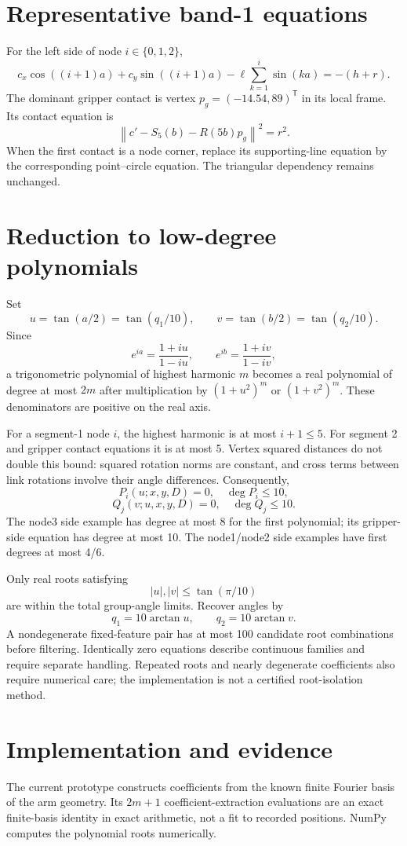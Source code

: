 \documentclass{article}
\begin{document}
\section{Representative band-1 equations}
For the left side of node $i\in\{0,1,2\}$,
\[
\boxed{c_x\cos((i+1)a)+c_y\sin((i+1)a)
-\ell\sum_{k=1}^{i}\sin(ka)=-(h+r).}
\]
The dominant gripper contact is vertex $p_g=(-14.54,89)^\mathsf T$ in its local frame. Its contact equation is
\[
\boxed{\left\|c'-S_5(b)-R(5b)p_g\right\|^2=r^2.}
\]
When the first contact is a node corner, replace its supporting-line equation by the corresponding point--circle equation. The triangular dependency remains unchanged.

\section{Reduction to low-degree polynomials}
Set
\[
u=\tan(a/2)=\tan(q_1/10),\qquad
v=\tan(b/2)=\tan(q_2/10).
\]
Since
\[
e^{ia}=\frac{1+iu}{1-iu},\qquad
e^{ib}=\frac{1+iv}{1-iv},
\]
a trigonometric polynomial of highest harmonic $m$ becomes a real polynomial of degree at most $2m$ after multiplication by $(1+u^2)^m$ or $(1+v^2)^m$. These denominators are positive on the real axis.

For a segment-1 node $i$, the highest harmonic is at most $i+1\leq5$. For segment 2 and gripper contact equations it is at most 5. Vertex squared distances do not double this bound: squared rotation norms are constant, and cross terms between link rotations involve their angle differences. Consequently,
\[
\boxed{P_i(u;x,y,D)=0,\quad \deg P_i\leq10,}
\]
\[
\boxed{Q_j(v;u,x,y,D)=0,\quad \deg Q_j\leq10.}
\]
The node3 side example has degree at most 8 for the first polynomial; its gripper-side equation has degree at most 10. The node1/node2 side examples have first degrees at most 4/6.

Only real roots satisfying
\[
|u|,|v|\leq\tan(\pi/10)
\]
are within the total group-angle limits. Recover angles by
\[
q_1=10\arctan u,\qquad q_2=10\arctan v.
\]
A nondegenerate fixed-feature pair has at most 100 candidate root combinations before filtering. Identically zero equations describe continuous families and require separate handling. Repeated roots and nearly degenerate coefficients also require numerical care; the implementation is not a certified root-isolation method.

\section{Implementation and evidence}
The current prototype constructs coefficients from the known finite Fourier basis of the arm geometry. Its $2m+1$ coefficient-extraction evaluations are an exact finite-basis identity in exact arithmetic, not a fit to recorded positions. NumPy computes the polynomial roots numerically.
\end{document}

